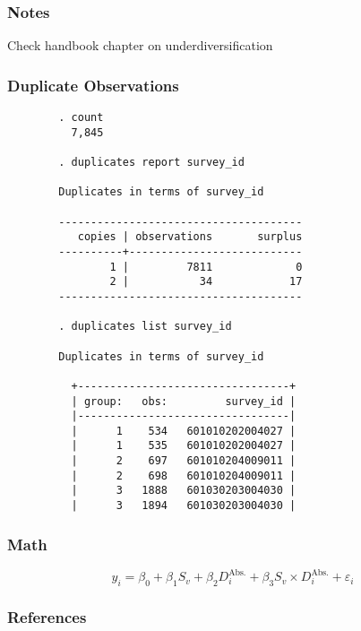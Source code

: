 \documentclass[aspectratio=169]{beamer}
\newenvironment{wideitemize}{\itemize\addtolength{\itemsep}{10pt}}{\enditemize}
\begin{document}
\begin{frame}[fragile] \frametitle{Notes}

	\begin{wideitemize}
		\item Check handbook chapter on underdiversification
	\end{wideitemize}

\end{frame}

\begin{frame}[fragile] \frametitle{Duplicate Observations}

	\tiny { \begin{verbatim}
		. count
		  7,845

		. duplicates report survey_id

		Duplicates in terms of survey_id

		--------------------------------------
		   copies | observations       surplus
		----------+---------------------------
		        1 |         7811             0
		        2 |           34            17
		--------------------------------------

		. duplicates list survey_id

		Duplicates in terms of survey_id

		  +---------------------------------+
		  | group:   obs:         survey_id |
		  |---------------------------------|
		  |      1    534   601010202004027 |
		  |      1    535   601010202004027 |
		  |      2    697   601010204009011 |
		  |      2    698   601010204009011 |
		  |      3   1888   601030203004030 |
		  |      3   1894   601030203004030 |
	\end{verbatim} }

\end{frame}

\begin{frame}[fragile] \frametitle{Math}

    \begin{equation*}
    y_i = \beta_0 + \beta_1 S_v + \beta_2 D^\text{Abs.}_i + \beta_3 S_v \times D^\text{Abs.}_i + \varepsilon_i
    \end{equation*}

\end{frame}

\begin{frame}[fragile] \frametitle{References}

    \printbibliography

\end{frame}
\end{document}
